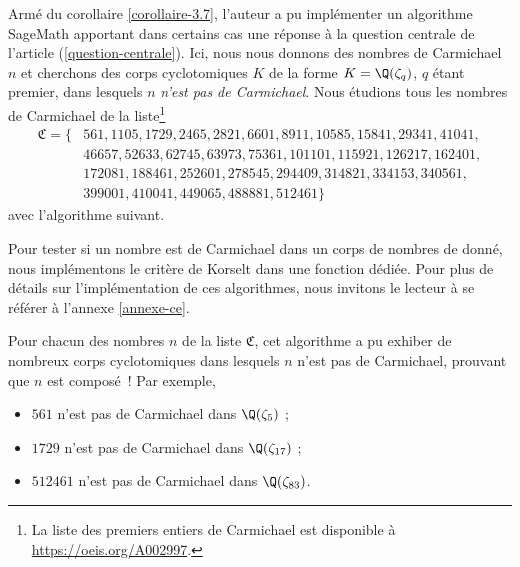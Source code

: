 \documentclass[a4paper, 12pt, oneside]{article}
\begin{document}
Armé du corollaire \ref{corollaire-3.7}, l'auteur a pu implémenter un algorithme SageMath apportant dans certains cas une réponse à la question centrale de l'article (\ref{question-centrale}). Ici, nous nous donnons des nombres de Carmichael $n$ et cherchons des corps cyclotomiques $K$ de la forme $K = \Q(\zeta_q)$, $q$ étant premier, dans lesquels $n$ \emph{n'est pas de Carmichael}. Nous étudions tous les nombres de Carmichael de la liste\footnote{La liste des premiers entiers de Carmichael est disponible à \url{https://oeis.org/A002997}.} 
\begin{align*}
	\mathfrak{C} = \{& 561, 1105, 1729, 2465, 2821, 6601, 8911, 10585, 15841, 29341, 41041,\\ 
	& 46657, 52633, 62745, 63973, 75361, 101101, 115921, 126217, 162401, \\ 
	& 172081, 188461, 252601, 278545, 294409, 314821, 334153, 340561, \\
	& 399001, 410041, 449065, 488881, 512461\}
\end{align*}
avec l'algorithme suivant.

\vspace{1em}
\begin{algorithm}[H]
\end{algorithm}
\vspace{1em}

\begin{remarque}
	Pour tester si un nombre est de Carmichael dans un corps de nombres de donné, nous implémentons le critère de Korselt dans une fonction dédiée. Pour plus de détails sur l'implémentation de ces algorithmes, nous invitons le lecteur à se référer à l'annexe \ref{annexe-ce}.
\end{remarque}

Pour chacun des nombres $n$ de la liste $\mathfrak{C}$, cet algorithme a pu exhiber de nombreux corps cyclotomiques dans lesquels $n$ n'est pas de Carmichael, prouvant que $n$ est composé~! Par exemple,
\begin{itemize}
	\item $561$ n'est pas de Carmichael dans $\Q(\zeta_5)$ ; 
	\item $1729$ n'est pas de Carmichael dans $\Q(\zeta_{17})$ ;
	\item $512461$ n'est pas de Carmichael dans $\Q(\zeta_{83})$.
\end{itemize}
\end{document}
